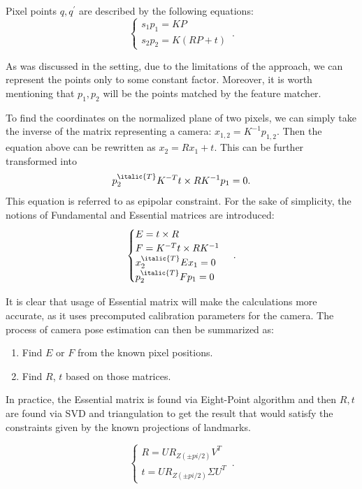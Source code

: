 Pixel points $q, q^{\prime}$ are described by the following equations:
\begin{equation}
    \begin{cases}
      s_{1} p_{1} = K P\\
      s_{2} p_{2} = K(RP + t)
    \end{cases}\,.
\end{equation}

As was discussed in the setting, due to the limitations of the approach, we can represent the points only to some constant factor. Moreover, it is worth mentioning that $p_{1}, p_{2}$ will be the points matched by the feature matcher.

To find the coordinates on the normalized plane of two pixels, we can simply take the inverse of the matrix representing a camera:
$x_{1, 2} = K^{-1}p_{1, 2}.$ Then the equation above can be rewritten as $x_{2} = Rx_{1} + t.$ This can be further transformed into $$p_{2}^{\italic{T}} K^{-T} t \times R K^{-1} p_{1} = 0.$$ This equation is referred to as epipolar constraint. For the sake of simplicity, the notions of Fundamental and Essential matrices are introduced:
\begin{equation}
    \begin{cases}
      E = t \times R\\
      F = K^{-T} t \times R K^{-1}\\
      x_{2}^{\italic{T}} E x_{1} = 0\\
      p_{2}^{\italic{T}} F p_{1} = 0
    \end{cases}\,.
\end{equation}

It is clear that usage of Essential matrix will make the calculations more accurate, as it uses precomputed calibration parameters for the camera. 
The process of camera pose estimation can then be summarized as:
\begin{enumerate}
    \item Find $E$ or $F$ from the known pixel positions.
    \item Find $R$, $t$ based on those matrices.
\end{enumerate}

In practice, the Essential matrix is found via Eight-Point algorithm and then $R, t$ are found via SVD and triangulation to get the result that would satisfy the constraints given by the known projections of landmarks.

\begin{equation}
    \begin{cases}
        R = U R_{Z(\pm pi/2)} V^{T}\\
        t = U R_{Z(\pm pi/2)} \Sigma U^{T}
    \end{cases}\,.
\end{equation}


